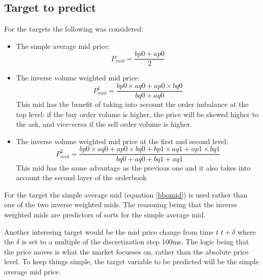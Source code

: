 \documentclass[english, 11pt, a4paper]{article}
\begin{document}
\subsection{Target to predict}
For the targets the following was considered:
\begin{itemize}
    \item The simple average mid price:
        \begin{equation}
            P_{mid} = \frac{bp0 + ap0}{2} \label{bbomid}
        \end{equation}
    \item The inverse volume weighted mid price:
        \begin{equation}
            P_{mid}^1 = \frac{bp0\times aq0 + ap0 \times bq0}{bq0 + aq0} \label{invmid1}
        \end{equation}
        This mid has the benefit of taking into account the order imbalance at the top level: if
        the buy order volume is higher, the price will be skewed higher to the ask, and vice-versa
        if the sell order volume is higher.
    \item The inverse volume weighted mid price at the first and second level:
        \begin{equation}
            P_{mid}^2 = \frac{bp0\times aq0 + ap0 \times bq0 + bp1\times aq1 + ap1 \times bq1}{bq0 +
            aq0+bq1+aq1} \label{invmid2}
        \end{equation}
        This mid has the same advantage as the previous one and it also takes into account the
        second layer of the orderbook
\end{itemize}

For the target the simple average mid (equation \ref{bbomid}) is used rather than one of the two
inverse weighted mids. The reasoning being that the inverse weighted mids are predictors of sorts for the simple average mid. 

Another interesing target would be the mid price change from time $t$  $t+\delta$ where the $\delta$
is set to a multiple of the discretization step 100ms. The logic being that the price moves is what
the market focueses on, rather than the absolute price level. To keep things simple, the target
variable to be predicted will be the simple average mid price.
\end{document}
